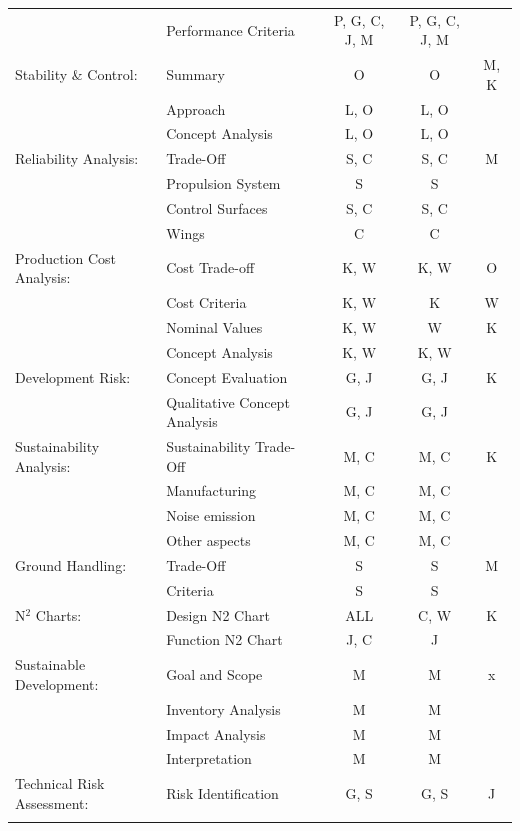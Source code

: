 \begin{longtable}[htb]{p{4cm}p{3cm}ccc}
        & Performance Criteria & P, G, C, J, M & P, G, C, J, M & \\ \hdashline
    Stability \& Control: & Summary & O & O & M, K \\ \hdashline
        & Approach & L, O & L, O & \\ \hdashline
        & Concept Analysis & L, O & L, O & \\ \hdashline
    Reliability Analysis: & Trade-Off & S, C  & S, C & M \\ \hdashline
        & Propulsion System & S & S & \\ \hdashline
        & Control Surfaces & S, C & S, C & \\ \hdashline
        & Wings & C & C & \\ \hdashline
    Production Cost Analysis: & Cost Trade-off & K, W & K, W & O \\ \hdashline
        & Cost Criteria & K, W & K & W \\ \hdashline
        & Nominal Values & K, W & W & K \\ \hdashline
        & Concept Analysis & K, W & K, W & \\ \hdashline
    Development Risk: & Concept Evaluation & G, J & G, J & K \\ \hdashline
        & Qualitative Concept Analysis & G, J & G, J & \\ \hdashline
    Sustainability Analysis: & Sustainability Trade-Off & M, C  & M, C & K\\ \hdashline
        & Manufacturing & M, C & M, C & \\ \hdashline
        & Noise emission & M, C & M, C & \\ \hdashline
        & Other aspects & M, C & M, C & \\ \hdashline
    Ground Handling: & Trade-Off & S & S & M \\ \hdashline
        & Criteria & S & S & \\ \hdashline
    N$^2$ Charts: & Design N2 Chart & ALL & C, W & K \\ \hdashline
        & Function N2 Chart & J, C & J & \\ \hdashline
    Sustainable Development: & Goal and Scope & M & M & x \\ \hdashline
        & Inventory Analysis & M & M & \\ \hdashline
        & Impact Analysis & M & M & \\ \hdashline
        & Interpretation & M & M & \\ \hdashline
    Technical Risk Assessment: & Risk Identification & G, S & G, S & J \\ \hdashline

\end{longtable}
